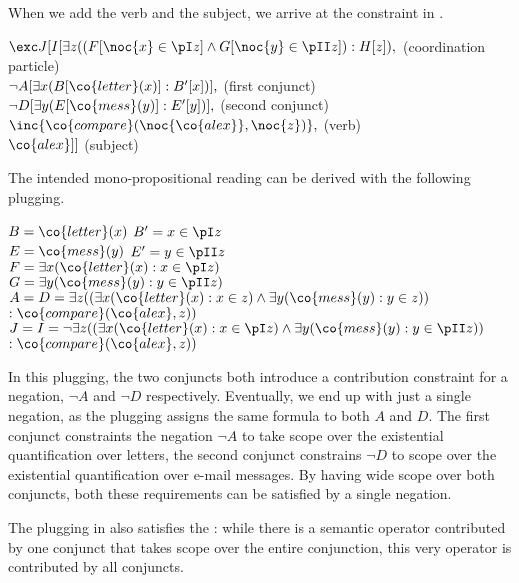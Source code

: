 \documentclass[output=paper]{langsci/langscibook}
\begin{document}
When we add the verb and the subject, we arrive at the  constraint in .

\ea \label{ex-brief-mail-lf}
$\exc J[I[
\exists z ((F[\noc{x} \in \pI z] \land G[\noc{y} \in \pII z]) : H[z]),$
\hfill (coordination particle)\\
$\lnot A[\exists x (B[\co{letter}(x)]: B'[x])],$
\hfill (first conjunct)\\
$\lnot D[\exists y (E[\co{mess}(y)]: E'[y])],$
\hfill (second conjunct)\\
$\inc{\co{compare}(\noc{\co{alex}},\noc{z})},$ \hfill (verb)\\
$\co{alex} 
]]$ \hfill (subject)
\z 

The intended mono-propositional reading can be derived with the following plugging.

\ea \label{ex-brief-mail-plug}
$B = \co{letter}(x)$ \qquad$B' = x \in \pI z$\\
$E = \co{mess}(y)$ \qquad $E' = y \in \pII z$\\
$F = \exists x (\co{letter}(x):x \in \pI z)$\\
$G = \exists y (\co{mess}(y) : y \in \pII z)$\\
$A = D = \exists z ((\exists x (\co{letter}(x):x \in z) \land 
\exists y (\co{mess}(y) : y \in z))$\\
\hspace*{\fill}$: \co{compare}(\co{alex},z))$\\
$J = I = \lnot \exists z ((\exists x (\co{letter}(x):x \in \pI z) \land 
\exists y (\co{mess}(y) : y \in \pII z))$\\
\hspace*{\fill}$ : \co{compare}(\co{alex},z))$
\z 

In this plugging, the two conjuncts both introduce a contribution constraint for a negation, $\lnot A$ and $\lnot D$ respectively. 
Eventually, we end up with just a single negation, as the plugging assigns the same formula to both $A$ and $D$. 
The first conjunct constraints the negation $\lnot A$ to take scope over the existential quantification over letters, the second conjunct constrains $\lnot D$ to scope over the existential quantification over e-mail messages. 
By having wide scope over both conjuncts, both these requirements can be satisfied by a single negation.

The plugging in  also satisfies the \SemATB: 
while there is a semantic operator contributed by one conjunct that takes scope over the entire conjunction, this very operator is contributed by all conjuncts.
\end{document}
